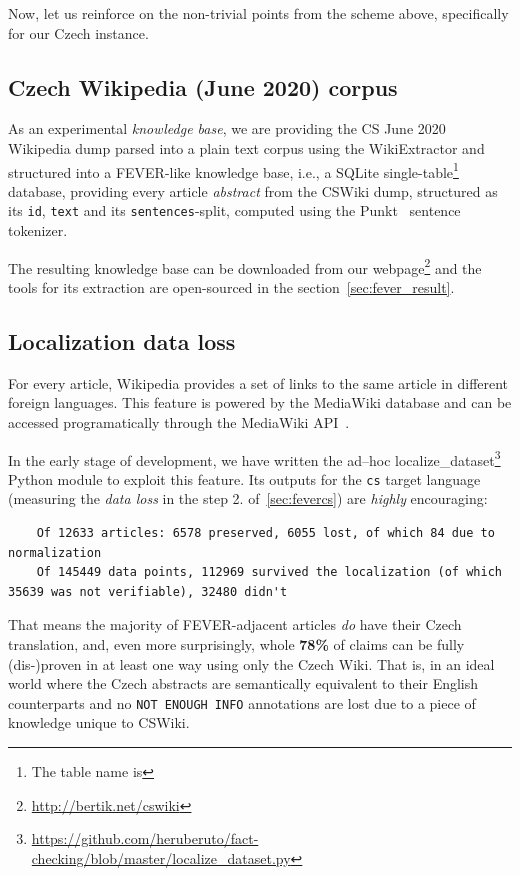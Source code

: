 Now, let us reinforce on the non-trivial points from the scheme above, specifically for our Czech instance.
\subsection{Czech Wikipedia (June 2020) corpus}
\label{sec:wikidump}
As an experimental \textit{knowledge base}, we are providing the \textsf{CS June 2020 Wikipedia dump} parsed into a plain text corpus using the \textsf{WikiExtractor} and structured into a \textsf{FEVER-}like knowledge base, i.e., a \textsf{SQLite} single-table\footnote{The table name is } database, providing every article \textit{abstract} from the \textsf{CSWiki} dump, structured as its \texttt{id}, \texttt{text} and its \texttt{sentences}-split, computed using the \textsf{Punkt}~\cite{punkt} sentence tokenizer. 

The resulting knowledge base can be downloaded from our webpage\footnote{\url{http://bertik.net/cswiki}} and the tools for its extraction are open-sourced in the section~\ref{sec:fever_result}.

\subsection{Localization data loss}
\label{sec:fever-loss}
For every article, \textsf{Wikipedia} provides a set of links to the same article in different foreign languages. This feature is powered by the \textsf{MediaWiki} database and can be accessed programatically through the \textsf{MediaWiki API}~\cite{mediawiki}. 

In the early stage of development, we have written the ad--hoc \textsf{localize\_dataset}\footnote{\url{https://github.com/heruberuto/fact-checking/blob/master/localize_dataset.py}} \textsf{Python} module to exploit this feature. Its outputs for the \texttt{cs} target language (measuring the \textit{data loss} in the step 2. of~\ref{sec:fevercs}) are \textit{highly} encouraging:

\begin{lstlisting}
    Of 12633 articles: 6578 preserved, 6055 lost, of which 84 due to normalization
    Of 145449 data points, 112969 survived the localization (of which 35639 was not verifiable), 32480 didn't
\end{lstlisting}

That means the majority of \textsf{FEVER-}adjacent articles \textit{do} have their Czech translation, and, even more surprisingly, whole \textbf{78\%} of claims can be fully (dis-)proven in at least one way using only the Czech \textsf{Wiki}. That is, in an ideal world where the Czech abstracts are semantically equivalent to their English counterparts and no \texttt{NOT ENOUGH INFO} annotations are lost due to a piece of knowledge unique to \textsf{CSWiki}.

